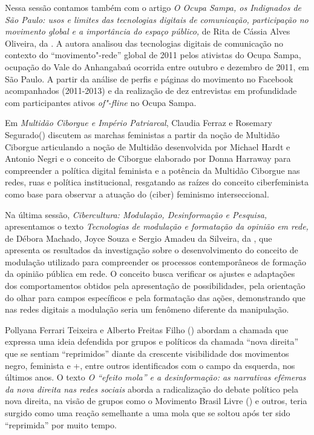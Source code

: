 Nessa sessão contamos também com o artigo \emph{O Ocupa Sampa, os
Indignados de São Paulo: usos e limites das tecnologias digitais de
comunicação, participação no movimento global e a importância do espaço
público,} de Rita de Cássia Alves Oliveira, da . A autora analisou
das tecnologias digitais de comunicação no contexto do
``movimento"-rede'' global de 2011 pelos ativistas do Ocupa Sampa,
ocupação do Vale do Anhangabaú ocorrida entre outubro e dezembro de
2011, em São Paulo. A partir da análise de perfis e páginas do movimento
no Facebook acompanhados (2011-2013) e da realização de dez entrevistas
em profundidade com participantes ativos \emph{of"-fline} no Ocupa Sampa.

Em \emph{Multidão Ciborgue e Império Patriarcal}, Claudia Ferraz e
Rosemary Segurado() discutem as marchas feministas a partir da
noção de Multidão Ciborgue articulando a noção de Multidão desenvolvida
por Michael Hardt e Antonio Negri e o conceito de Ciborgue elaborado por
Donna Harraway para compreender a política digital feminista e a
potência da Multidão Ciborgue nas redes, ruas e política institucional,
resgatando as raízes do conceito ciberfeminista como base para observar
a atuação do (ciber) feminismo interseccional.

Na última sessão, \emph{Cibercultura: Modulação, Desinformação e
Pesquisa,} apresentamos o texto \emph{Tecnologias de modulação e
formatação da opinião em rede,} de Débora Machado, Joyce Souza e Sergio
Amadeu da Silveira, da , que apresenta os resultados da
investigação sobre o desenvolvimento do conceito de modulação utilizado
para compreender os processos contemporâneos de formação da opinião
pública em rede. O conceito busca verificar os ajustes e adaptações dos
comportamentos obtidos pela apresentação de possibilidades, pela
orientação do olhar para campos específicos e pela formatação das ações,
demonstrando que nas redes digitais a modulação seria um fenômeno
diferente da manipulação.

Pollyana Ferrari Teixeira e Alberto Freitas Filho () abordam a
chamada que expressa uma ideia defendida por grupos e políticos da
chamada ``nova direita'' que se sentiam ``reprimidos'' diante da
crescente visibilidade dos movimentos negro, feminista e +, entre
outros identificados com o campo da esquerda, nos últimos anos. O texto
\emph{O ``efeito mola'' e a desinformação: as narrativas efêmeras da
nova direita nas redes sociais} aborda a radicalização do debate
político pela nova direita, na visão de grupos como o Movimento Brasil
Livre () e outros, teria surgido como uma reação semelhante a uma
mola que se soltou após ter sido ``reprimida'' por muito tempo.

